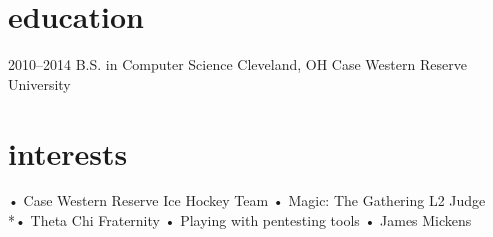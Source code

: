 \documentclass[]{friggeri-cv}
\begin{document}
\section{education}

\begin{entrylist}
  \entry
    {2010–2014}
    {B.S. in Computer Science}
    {Cleveland, OH}
    {Case Western Reserve University}
\end{entrylist}

\section{interests}
•	Case Western Reserve Ice Hockey Team
•	Magic: The Gathering L2 Judge
\\*•	Theta Chi Fraternity
•	Playing with pentesting tools
•	James Mickens
% 
\end{document}
